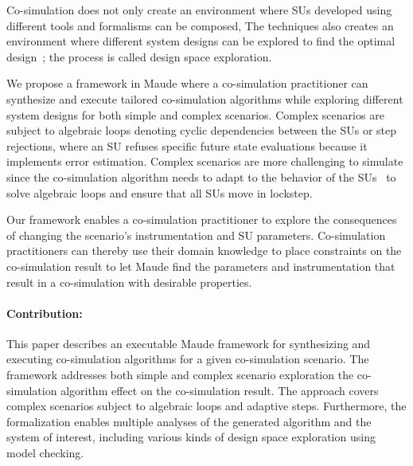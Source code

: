 Co-simulation does not only create an environment where SUs developed using different tools and formalisms can be composed,
The techniques also creates an environment where different system designs can be explored to find the optimal design~\cite{dse,gamble_design_2014}; the process is called design space exploration.

We propose a framework in Maude where a co-simulation practitioner can synthesize and execute tailored co-simulation algorithms while exploring different system designs for both simple and complex scenarios.
Complex scenarios are subject to algebraic loops denoting cyclic dependencies between the SUs or step rejections, where an SU refuses specific future state evaluations because it implements error estimation.
Complex scenarios are more challenging to simulate since the co-simulation algorithm needs to adapt to the behavior of the SUs~\cite{thrane2021} to solve algebraic loops and ensure that all SUs move in lockstep.

Our framework enables a co-simulation practitioner to explore the consequences of changing the scenario's instrumentation and SU parameters. 
Co-simulation practitioners can thereby use their domain knowledge to place constraints on the co-simulation result to let Maude find the parameters and instrumentation that result in a co-simulation with desirable properties. 

\paragraph{Contribution:}
This paper describes an executable Maude framework for synthesizing and executing co-simulation algorithms for a given co-simulation scenario.
The framework addresses both simple and complex scenario  exploration the co-simulation algorithm effect on the co-simulation result.
The approach covers complex scenarios subject to algebraic loops and adaptive steps.
Furthermore, the formalization enables multiple analyses of the generated algorithm and the system of interest, including various kinds of design space exploration using model checking. 

